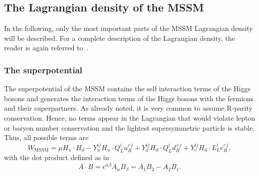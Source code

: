 \subsection{The Lagrangian density of the MSSM}
\label{sec:Lagrange_MSSM}
In the following, only the most important parts of the MSSM Lagrangian density will be described.
For a complete description of the Lagrangian density, the reader is again referred to~\cite{bib:Drees_2004}.

\subsubsection*{The superpotential}
The superpotential of the MSSM contains the self interaction terms of the Higgs bosons and generates the interaction terms of the Higgs bosons with the fermions and their superpartners.
As already noted, it is very common to assume R-parity conservation.
Hence, no terms appear in the Lagrangian that would violate lepton or baryon number conservation and the lightest supersymmetric particle is stable.
Thus, all possible terms are
\begin{equation}
\label{eq:SPMSSM}
 W_{\text{MSSM}} = \mu H_u \cdot H_d - Y_u^{ij} H_u \cdot Q_L^i u_R^{c\,j} + Y_d^{ij} H_d \cdot Q_L^i d_R^{\,c\,j} + Y_e^{ij} H_d \cdot L_L^i e_R^{c\,j},
\end{equation}
with the dot product defined as in~\cite{bib:Aitchison_2005} 
\begin{equation}
 A \cdot B = \epsilon^{\alpha\beta} A_{\alpha} B_{\beta} = A_1 B_2 - A_2 B_1.
\end{equation}

